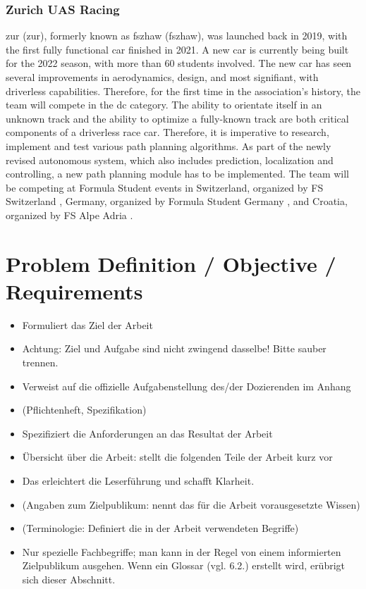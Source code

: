 \subsubsection{Zurich UAS Racing}
\acrlong{zur} (\acrshort{zur}), formerly known as \acrlong{fszhaw} (\acrshort{fszhaw}), was launched back in 2019, with the first fully functional car finished in 2021. A new car is currently being built for the 2022 season, with more than 60 students involved. The new car has seen several improvements in aerodynamics, design, and most signifiant, with driverless capabilities. \cite{fszhaw_launch}
Therefore, for the first time in the association's history, the team will compete in the \acrshort{dc} category.
The ability to orientate itself in an unknown track and the ability to optimize a fully-known track are both critical components of a driverless race car. Therefore, it is imperative to research, implement and test various path planning algorithms. As part of the newly revised autonomous system, which also includes prediction, localization and controlling, a new path planning module has to be implemented.
The team will be competing at Formula Student events in Switzerland, organized by FS Switzerland \cite{fsswitzerland}, Germany, organized by Formula Student Germany \cite{fs_germany}, and Croatia, organized by FS Alpe Adria \cite{fs_alpe_adria}.

\section{Problem Definition / Objective / Requirements}
\begin{itemize}
    \item Formuliert das Ziel der Arbeit
    \item Achtung: Ziel und Aufgabe sind nicht zwingend dasselbe! Bitte sauber trennen.
    \item Verweist auf die offizielle Aufgabenstellung des/der Dozierenden im Anhang
    \item (Pflichtenheft, Spezifikation)
    \item Spezifiziert die Anforderungen an das Resultat der Arbeit
    \item Übersicht über die Arbeit: stellt die folgenden Teile der Arbeit kurz vor
    \item Das erleichtert die Leserführung und schafft Klarheit.
    \item (Angaben zum Zielpublikum: nennt das für die Arbeit vorausgesetzte Wissen)
    \item (Terminologie: Definiert die in der Arbeit verwendeten Begriffe)
    \item Nur spezielle Fachbegriffe; man kann in der Regel von einem informierten Zielpublikum ausgehen.
    Wenn ein Glossar (vgl. 6.2.) erstellt wird, erübrigt sich dieser Abschnitt.
\end{itemize}

